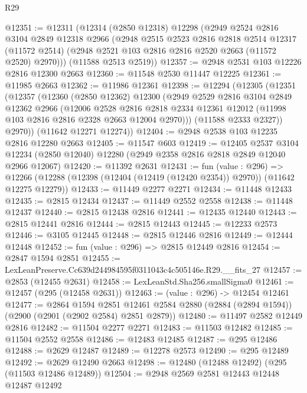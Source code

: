\begin{lexlean}{R29}
\begin{coremodule}
@12351 := @12311
    (@12314
      (@2850 @12318)
      @12298
      (@2949
        @2524
        @2816
        @3104
        @2849
        @12318
        @2966
        (@2948
          @2515
          @2523
          @2816
          @2818
          @2514
          @12317
          (@11572 @2514)
          (@2948 @2521 @103 @2816 @2816 @2520 @2663 (@11572 @2520) @2970)))
      (@11588 @2513 @2519))
@12357 := @2948 @2531 @103 @12226 @2816 @12300 @2663
@12360 := @11548 @2530 @11447 @12225
@12361 := @11985 @2663
@12362 := @11986 @12361
@12398 := @12294
    (@12305
      (@12351
        (@12357
          (@12360
            (@2850 @12362)
            @12300
            (@2949
              @2529
              @2816
              @3104
              @2849
              @12362
              @2966
              (@12006
                @2528
                @2816
                @2818
                @2334
                @12361
                @12012
                (@11998 @103 @2816 @2816 @2328 @2663 @12004 @2970)))
            (@11588 @2333 @2327))
          @2970))
      (@11642 @12271 @12274))
@12404 := @2948 @2538 @103 @12235 @2816 @12280 @2663
@12405 := @11547 @603
@12419 := @12405
    @2537
    @3104
    @12234
    (@2850 @12040)
    @12280
    (@2949 @2358 @2816 @2818 @2849 @12040 @2966 @12067)
@12420 := @11392 @2631
@12431 := fun (value : @296) =>
  @12266 (@12288 (@12398 (@12404 (@12419 (@12420 @2354)) @2970)) (@11642 @12275 @12279))
@12433 := @11449 @2277 @2271
@12434 := @11448 @12433
@12435 := @2815 @12434
@12437 := @11449 @2552 @2558
@12438 := @11448 @12437
@12440 := @2815 @12438 @2816
@12441 := @12435 @12440
@12443 := @2815 @12441 @2816
@12444 := @2815 @12443
@12445 := @12233 @2573
@12446 := @3105 @12445
@12448 := @2815 @12446 @2816
@12449 := @12444 @12448
@12452 := fun (value : @296) => @2815 @12449 @2816
@12454 := @2847 @1594 @2851
@12455 := LexLeanPreserve.Cc639d244984595f0311043c4c505146e.R29.__fits_27
@12457 := @2853 (@12455 @2631)
@12458 := LexLeanStd.Sha256.smallSigma0
@12461 := @12457 (@295 (@12458 @2631))
@12463 := (value : @296) -> @12454 @12461
@12477 := @2864
    @1594
    @2851
    @12461
    @2584
    @2880
    (@2884 (@2894 @1594))
    (@2900 (@2901 (@2902 @2584) @2851 @2879))
@12480 := @11497 @2582 @12449 @2816
@12482 := @11504 @2277 @2271
@12483 := @11503 @12482
@12485 := @11504 @2552 @2558
@12486 := @12483 @12485
@12487 := @295 @12486
@12488 := @2629 @12487
@12489 := @12278 @2573
@12490 := @295 @12489
@12492 := @2629 @12490 @2663
@12498 := @12480 (@12488 @12492) (@295 (@11503 @12486 @12489))
@12504 := @2948 @2569 @2581 @12443 @12448 @12487 @12492

\end{coremodule}
\end{lexlean}
